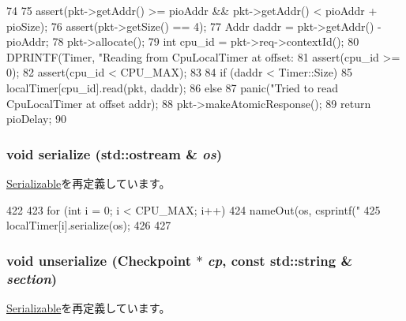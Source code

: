 \begin{DoxyCode}
74 {
75     assert(pkt->getAddr() >= pioAddr && pkt->getAddr() < pioAddr + pioSize);
76     assert(pkt->getSize() == 4);
77     Addr daddr = pkt->getAddr() - pioAddr;
78     pkt->allocate();
79     int cpu_id = pkt->req->contextId();
80     DPRINTF(Timer, "Reading from CpuLocalTimer at offset: %
81     assert(cpu_id >= 0);
82     assert(cpu_id < CPU_MAX);
83 
84     if (daddr < Timer::Size)
85         localTimer[cpu_id].read(pkt, daddr);
86     else
87         panic("Tried to read CpuLocalTimer at offset %
      addr);
88     pkt->makeAtomicResponse();
89     return pioDelay;
90 }
\end{DoxyCode}
\hypertarget{classCpuLocalTimer_a53e036786d17361be4c7320d39c99b84}{
\subsubsection[{serialize}]{\setlength{\rightskip}{0pt plus 5cm}void serialize (std::ostream \& {\em os})}}
\label{classCpuLocalTimer_a53e036786d17361be4c7320d39c99b84}


\hyperlink{classSerializable_ad6272f80ae37e8331e3969b3f072a801}{Serializable}を再定義しています。


\begin{DoxyCode}
422 {
423     for (int i = 0; i < CPU_MAX; i++) {
424         nameOut(os, csprintf("%
425         localTimer[i].serialize(os);
426     }
427 }
\end{DoxyCode}
\hypertarget{classCpuLocalTimer_af22e5d6d660b97db37003ac61ac4ee49}{
\subsubsection[{unserialize}]{\setlength{\rightskip}{0pt plus 5cm}void unserialize ({\bf Checkpoint} $\ast$ {\em cp}, \/  const std::string \& {\em section})}}
\label{classCpuLocalTimer_af22e5d6d660b97db37003ac61ac4ee49}


\hyperlink{classSerializable_af100c4e9feabf3cd918619c88c718387}{Serializable}を再定義しています。


